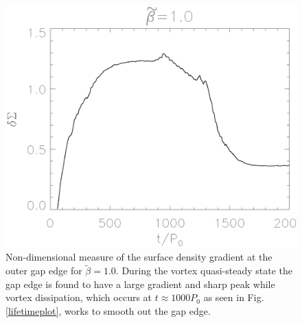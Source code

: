\begin{figure}
  \includegraphics[width=\linewidth]{figures/gap_smoothness}
  \caption{Non-dimensional measure of the surface density gradient at
    the outer gap edge for $\tilde\beta=1.0$. During the vortex quasi-steady state
    the gap edge is found to have a large gradient and sharp peak while vortex
    dissipation,
    which occurs at $t\approx1000P_0$ as seen in Fig. \ref{lifetimeplot},
    works to smooth out the gap edge.
    \label{smoothnessplot}}  
\end{figure}





